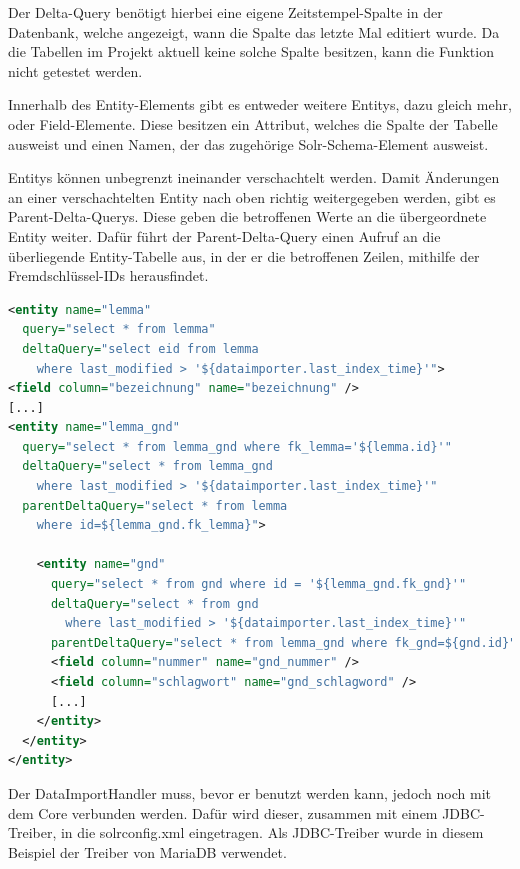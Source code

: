 Der Delta-Query benötigt hierbei eine eigene Zeitstempel-Spalte in der Datenbank, welche angezeigt, wann die Spalte das letzte Mal editiert wurde. Da die Tabellen im Projekt aktuell keine solche Spalte besitzen, kann die Funktion nicht getestet werden.

Innerhalb des Entity-Elements gibt es entweder weitere Entitys, dazu gleich mehr, oder Field-Elemente. Diese besitzen ein Attribut, welches die Spalte der Tabelle ausweist und einen Namen, der das zugehörige Solr-Schema-Element ausweist. 

Entitys können unbegrenzt ineinander verschachtelt werden. Damit Änderungen an einer verschachtelten Entity nach oben richtig weitergegeben werden, gibt es Parent-Delta-Querys. Diese geben die betroffenen Werte an die übergeordnete Entity weiter. Dafür führt der Parent-Delta-Query einen Aufruf an die überliegende Entity-Tabelle aus, in der er die betroffenen Zeilen, mithilfe der Fremdschlüssel-IDs herausfindet.

\begin{lstlisting}[language=xml, frame=single, label={lst:dih}, morekeywords={entity,query,deltaQuery,parentDeltaQuery,field,column, name}, 
  caption=Ausschnitt aus dem DataImportHandler,captionpos=b] 
<entity name="lemma" 
  query="select * from lemma" 
  deltaQuery="select eid from lemma 
    where last_modified > '${dataimporter.last_index_time}'"> 
<field column="bezeichnung" name="bezeichnung" />
[...]
<entity name="lemma_gnd" 
  query="select * from lemma_gnd where fk_lemma='${lemma.id}'"
  deltaQuery="select * from lemma_gnd 
    where last_modified > '${dataimporter.last_index_time}'"
  parentDeltaQuery="select * from lemma 
    where id=${lemma_gnd.fk_lemma}">
  
    <entity name="gnd" 
      query="select * from gnd where id = '${lemma_gnd.fk_gnd}'"
      deltaQuery="select * from gnd 
        where last_modified > '${dataimporter.last_index_time}'"
      parentDeltaQuery="select * from lemma_gnd where fk_gnd=${gnd.id}">
      <field column="nummer" name="gnd_nummer" />
      <field column="schlagwort" name="gnd_schlagword" />
      [...]
    </entity>
  </entity>  
</entity>
\end{lstlisting}

Der DataImportHandler muss, bevor er benutzt werden kann, jedoch noch mit dem Core verbunden werden. Dafür wird dieser, zusammen mit einem JDBC-Treiber, in die solrconfig.xml eingetragen. Als JDBC-Treiber wurde in diesem Beispiel der Treiber von MariaDB verwendet.

